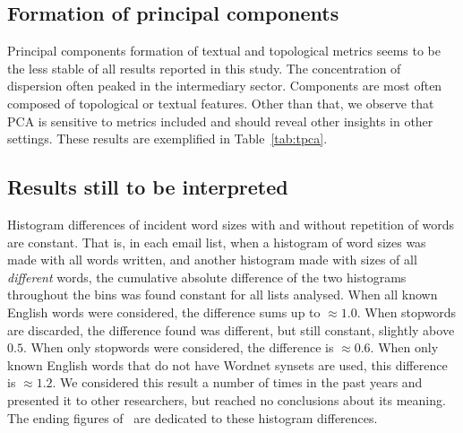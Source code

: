 \subsection{Formation of principal components}\label{subsec:pc}
% 
Principal components formation of textual and topological metrics
seems to be the less stable of all results reported in this study.
The concentration of dispersion often peaked in the intermediary sector.
Components are most often composed of topological or textual features.
Other than that, we observe that PCA is sensitive to metrics included
and should reveal other insights in other settings.
These results are exemplified in Table~\ref{tab:tpca}.


\subsection{Results still to be interpreted}\label{subsec:sii}
Histogram differences of incident word sizes with and without repetition of words are constant.
That is, in each email list, when a histogram of word sizes was made with all words written, and another histogram made with sizes of all \emph{different} words, the cumulative absolute difference of the two histograms throughout the bins was found constant for all lists analysed.
When all known English words were considered, 
the difference sums up to $\approx 1.0$.
When stopwords are discarded,
the difference found was different, but still constant, slightly above $0.5$.
When only stopwords were considered, the difference is $\approx 0.6$.
When only known English words that do not have Wordnet synsets are used,
this difference is $\approx 1.2$.
We considered this result a number of times in the past years and presented it to other researchers,
but reached no conclusions about its meaning.
The ending figures of~\cite{textTables} are dedicated to these histogram differences.

